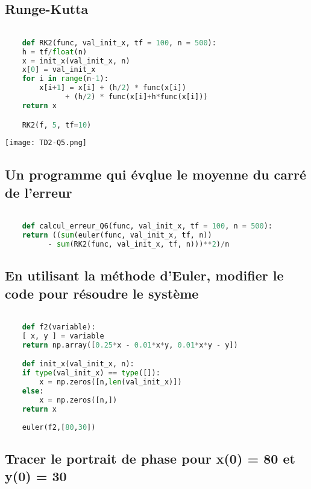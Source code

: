 \documentclass[a4paper,10pt]{article}
\begin{document}
\subsection { Runge-Kutta }
\begin{lstlisting}[language=Python]

    def RK2(func, val_init_x, tf = 100, n = 500):
	h = tf/float(n)
	x = init_x(val_init_x, n)
	x[0] = val_init_x
	for i in range(n-1):
	    x[i+1] = x[i] + (h/2) * func(x[i]) 
		      + (h/2) * func(x[i]+h*func(x[i]))
	return x

    RK2(f, 5, tf=10)

\end{lstlisting} 

\begin{center}
\texttt{[image: TD2-Q5.png]}
\end{center}

\subsection { Un programme qui évqlue le moyenne du carré de l'erreur }
\begin{lstlisting}[language=Python]

    def calcul_erreur_Q6(func, val_init_x, tf = 100, n = 500):
	return ((sum(euler(func, val_init_x, tf, n)) 
		  - sum(RK2(func, val_init_x, tf, n)))**2)/n

\end{lstlisting}

\subsection { En utilisant la méthode d'Euler, modifier le code pour résoudre le système}
\begin{lstlisting}[language=Python]

    def f2(variable):
	[ x, y ] = variable
	return np.array([0.25*x - 0.01*x*y, 0.01*x*y - y])

    def init_x(val_init_x, n):
	if type(val_init_x) == type([]):
	    x = np.zeros([n,len(val_init_x)])
	else:
	    x = np.zeros([n,])
	return x    
	
    euler(f2,[80,30])

\end{lstlisting}

\subsection { Tracer le portrait de phase pour x(0) = 80 et y(0) = 30 }
\end{document}

